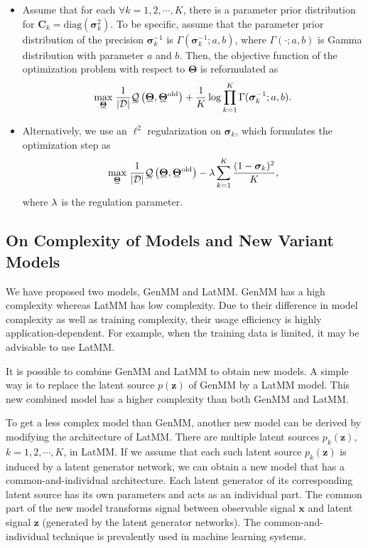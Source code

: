 \begin{itemize}
\item Assume that for each $\forall k=1, 2, \cdots, K$, there is a parameter prior distribution for $\bm{C}_k=\mathrm{diag}(\bm{\sigma}_k^2)$.
  To be specific, assume that the parameter prior distribution of the precision $\bm{\sigma}_k^{-1}$ is
  $\Gamma(\bm{\sigma}_k^{-1};a, b)$, where $\Gamma(\cdot; a, b)$ is
  Gamma distribution with parameter $a$ and $b$. Then, the objective function of the optimization problem with respect to $\bm{\Theta}$ is reformulated as
  \begin{equation}\label{eq-latmm-obj1}
    \umax{ \ubar{\bm{\Theta}}}   \frac{1}{\abs{\Dd}}
    \ubar{\Qq}\left(\ubar{\bm{\Theta}},\ubar{\bm{\Theta}}^{\mathrm{old}} \right)
    +\frac{1}{K}
    \log\prod_{k=1}^K
    \Gamma(\bm{\sigma}_k^{-1};
    a, b).
  \end{equation}
\item Alternatively, we use an $\ell^2$ regularization on $\bm{\sigma}_k$,
  which formulates the optimization step as
  \begin{equation}
    \umax{\ubar{\bm{\Theta}}}   \frac{1}{\abs{\Dd}} \ubar{\Qq}\left(\ubar{\bm{\Theta}},\ubar{\bm{\Theta}}^{\mathrm{old}}\right)-\lambda \sum_{k=1}^K \frac{(1- \bm{\sigma}_k)^2}{K},
  \end{equation}
  where $\lambda$ is the regulation parameter.
\end{itemize}

\subsection{On Complexity of Models and New Variant Models}
We have proposed two models, GenMM and LatMM. GenMM has a high complexity whereas LatMM has low complexity. Due to their difference in model complexity as well as training complexity, their usage efficiency is highly application-dependent. For example, when the training data is limited, it may be advisable to use LatMM.

It is possible to combine GenMM and LatMM to obtain new models. A simple way is to replace the latent source $p(\bm{z})$ of GenMM by a LatMM model. 
This new combined model has a higher complexity than both GenMM and LatMM. %

To get a less complex model than GenMM, another new model can be derived by modifying the architecture of LatMM. There are multiple latent sources $p_k(\bm{z})$, $k=1, 2, \cdots, K$, in LatMM. If we assume that each such latent source $p_k(\bm{z})$ is induced by a latent generator network, we can obtain a new model that has a common-and-individual architecture. Each latent generator of its corresponding latent source has its own parameters and acts as an individual part. The common part of the new model transforms signal between observable signal $\bm{x}$ and latent signal $\bm{z}$ (generated by the latent generator networks). The common-and-individual technique is prevalently used in machine learning systems\cite{sundman2016design, SUNDMAN2014298}.

